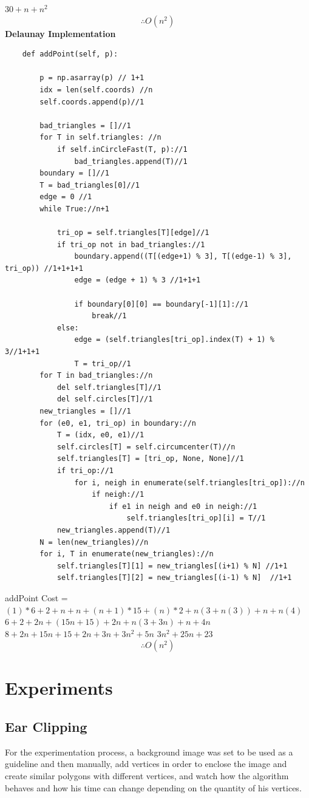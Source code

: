 \documentclass[conference]{IEEEtran}
\begin{document}
$30+n+n^2$
$$\therefore O(n^2)$$
\textbf{Delaunay Implementation}
\begin{lstlisting}
    def addPoint(self, p):
    
        p = np.asarray(p) // 1+1
        idx = len(self.coords) //n
        self.coords.append(p)//1

        bad_triangles = []//1
        for T in self.triangles: //n
            if self.inCircleFast(T, p)://1
                bad_triangles.append(T)//1
        boundary = []//1
        T = bad_triangles[0]//1
        edge = 0 //1
        while True://n+1
           
            tri_op = self.triangles[T][edge]//1
            if tri_op not in bad_triangles://1
                boundary.append((T[(edge+1) % 3], T[(edge-1) % 3], tri_op)) //1+1+1+1
                edge = (edge + 1) % 3 //1+1+1

                if boundary[0][0] == boundary[-1][1]://1
                    break//1
            else:
                edge = (self.triangles[tri_op].index(T) + 1) % 3//1+1+1
                T = tri_op//1
        for T in bad_triangles://n
            del self.triangles[T]//1
            del self.circles[T]//1
        new_triangles = []//1
        for (e0, e1, tri_op) in boundary://n
            T = (idx, e0, e1)//1
            self.circles[T] = self.circumcenter(T)//n
            self.triangles[T] = [tri_op, None, None]//1
            if tri_op://1
                for i, neigh in enumerate(self.triangles[tri_op])://n
                    if neigh://1
                        if e1 in neigh and e0 in neigh://1
                            self.triangles[tri_op][i] = T//1
            new_triangles.append(T)//1
        N = len(new_triangles)//n
        for i, T in enumerate(new_triangles)://n
            self.triangles[T][1] = new_triangles[(i+1) % N] //1+1  
            self.triangles[T][2] = new_triangles[(i-1) % N]  //1+1
\end{lstlisting}
addPoint Cost = 
\newline
$(1)*6+2+n+n+(n+1)*15+(n)*2+n(3+n(3))+n+n(4)$
\newline
$6+2+2n+(15n+15)+2n+n(3+3n)+n+4n$
\newline
$8+2n+15n+15+2n+3n+3n^2+5n$
\newline
$3n^2+25n+23$
$$\therefore O(n^2)$$
\section{Experiments}
\subsection{Ear Clipping}
For the experimentation process, a background image was set to be used as a guideline and then manually, add vertices in order to enclose the image and create similar polygons with different vertices, and watch how the algorithm behaves and how his time can change depending on the quantity of his vertices.
\end{document}
